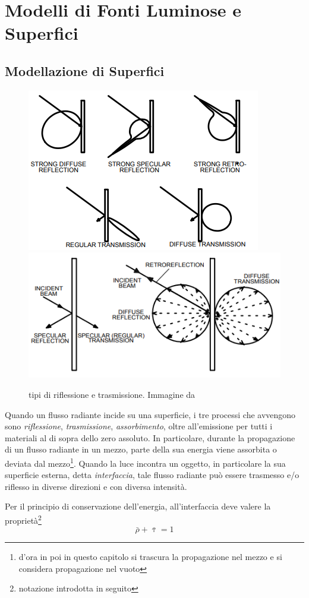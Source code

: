 \chapter{Modelli di Fonti Luminose e Superfici}
\section{Modellazione di Superfici}
\begin{figure}[tb]
	\centering
	\includegraphics[width=0.4\linewidth]{../assets/chapter3_surfaces_interaction_types.png}
	\includegraphics[width=0.4\linewidth]{../assets/chapter3_surfaces_specular_interaction.png}
	\caption{tipi di riflessione e trasmissione. Immagine da \cite{art-rad}}
	\label{chapter3:surface:interactionTypes}
\end{figure}
Quando un flusso radiante incide su una superficie, i tre processi che avvengono sono \textit{riflessione}, \textit{trasmissione}, 
\textit{assorbimento}, oltre all'emissione per tutti i materiali al di sopra dello zero assoluto. 
In particolare, durante la propagazione di un flusso radiante in un mezzo, parte della sua energia viene assorbita o 
deviata dal mezzo\footnote{d'ora in poi in questo capitolo si trascura la propagazione nel mezzo e si considera propagazione nel vuoto}.
Quando la luce incontra un oggetto, in particolare la sua superficie esterna, detta \textit{interfaccia}, tale flusso radiante pu\`o essere 
trasmesso e/o riflesso in diverse direzioni e con diversa intensit\`a.\par
Per il principio di conservazione dell'energia, all'interfaccia deve valere la propriet\`a\footnote{notazione introdotta in seguito}
\begin{equation}\label{chapter3:surface:interfaceEnergyConservation}
	\bar{\rho} + \bar{\uptau} = 1
\end{equation}
